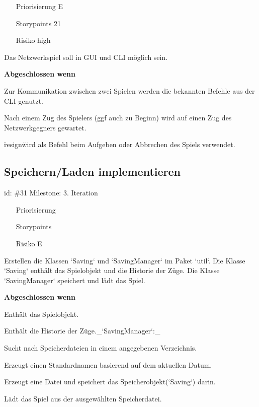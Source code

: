 \begin{itemize}
\item[Priorisierung] E
\item[Storypoints] 21
\item[Risiko] high
\end{itemize}

Das Netzwerkspiel soll in GUI und CLI möglich sein.

\textbf{Abgeschlossen wenn}
\begin{todolist}
    \item[\done]  Zur Kommunikation zwischen zwei Spielen werden die bekannten Befehle aus der CLI genutzt.
  \item[\done]  Nach einem Zug des Spielers (ggf auch zu Beginn) wird auf einen Zug des Netzwerkgegners gewartet.
  \item[\done]  \"resign\" wird als Befehl beim Aufgeben oder Abbrechen des Spiels verwendet.

\end{todolist}


\subsection*{Speichern/Laden implementieren}
id: \#31 Milestone: 3. Iteration\\

\begin{itemize}
\item[Priorisierung] 
\item[Storypoints] 
\item[Risiko] E
\end{itemize}

Erstellen die Klassen `Saving` und `SavingManager` im Paket `util`. Die Klasse `Saving` enthält das Spielobjekt und die Historie der Züge. Die Klasse `SavingManager` speichert und lädt das Spiel.

\textbf{Abgeschlossen wenn}
\begin{todolist}
    \item[\done]  Enthält das Spielobjekt.
  \item[\done]  Enthält die Historie der Züge._`SavingManager`:_
  \item[\done]  Sucht nach Speicherdateien in einem angegebenen Verzeichnis.
  \item[\done]  Erzeugt einen Standardnamen basierend auf dem aktuellen Datum.
  \item[\done]  Erzeugt eine Datei und speichert das Speicherobjekt(`Saving`) darin.
  \item[\done]  Lädt das Spiel aus der ausgewählten Speicherdatei.

\end{todolist}


